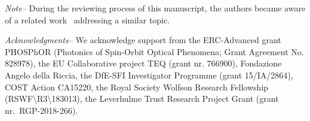 \documentclass[
	aps, prl, superscriptaddress, twocolumn,
	10pt
	floatfix, 
    nofootinbib,
	tightenlines
]{revtex4-1}
\begin{document}
\textit{Note--} During the reviewing process of this manuscript, the authors
became aware of a related work~\cite{Zhanwei_oamCNN} addressing a similar topic. 




\begin{acknowledgments}
\textit{Acknowledgments--} We acknowledge support from the ERC-Advanced grant PHOSPhOR (Photonics of Spin-Orbit Optical Phenomena; 
Grant Agreement No. 828978), the EU Collaborative project TEQ (grant nr. 766900), Fondazione Angelo della Riccia, the DfE-SFI Investigator Programme (grant 15/IA/2864), COST Action CA15220, the Royal Society Wolfson Research Fellowship (RSWF\textbackslash R3\textbackslash183013), the Leverhulme Trust Research Project Grant (grant nr.~RGP-2018-266).
\end{acknowledgments}

\end{document}
